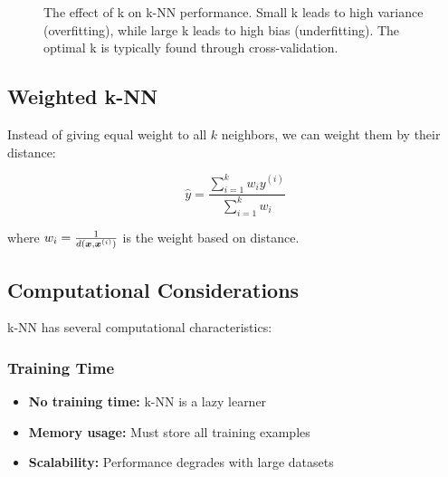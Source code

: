 \begin{figure}[htbp]
\centering
{}
\caption{The effect of k on k-NN performance. Small k leads to high variance (overfitting), while large k leads to high bias (underfitting). The optimal k is typically found through cross-validation.}
\label{fig:knn-k-selection}
\end{figure}

\subsection{Weighted k-NN}

Instead of giving equal weight to all $k$ neighbors, we can weight them by their distance:

\begin{equation}
\hat{y} = \frac{\sum_{i=1}^{k} w_i y^{(i)}}{\sum_{i=1}^{k} w_i}
\end{equation}

where $w_i = \frac{1}{d(\boldsymbol{x}, \boldsymbol{x}^{(i)})}$ is the weight based on distance.

\subsection{Computational Considerations}

k-NN has several computational characteristics:

\subsubsection{Training Time}
\begin{itemize}
    \item \textbf{No training time:} k-NN is a lazy learner
    \item \textbf{Memory usage:} Must store all training examples
    \item \textbf{Scalability:} Performance degrades with large datasets
\end{itemize}

